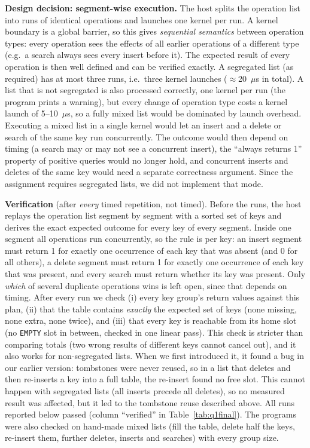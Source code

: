 \documentclass[10pt,a4paper]{article}
\begin{document}
\textbf{Design decision: segment-wise execution.} The host splits the
operation list into runs of identical operations and launches one kernel per
run. A kernel boundary is a global barrier, so this gives \emph{sequential
semantics} between operation types: every operation sees the effects of all
earlier operations of a different type (e.g.\ a search always sees every insert
before it). The expected result of every operation is then well defined and
can be verified exactly. A segregated list (as required) has at most three runs,
i.e.\ three kernel launches ($\approx$20~$\mu$s in total). A list that is not
segregated is also processed correctly, one kernel per run (the program prints a
warning), but every change of operation type costs a kernel launch of
5--10~$\mu$s, so a fully mixed list would be dominated by launch overhead.
Executing a mixed list in a single kernel would let an insert and a delete or
search of the same key run concurrently. The outcome would then depend on timing
(a search may or may not see a concurrent insert), the ``always returns 1''
property of positive queries would no longer hold, and concurrent inserts and
deletes of the same key would need a separate correctness argument. Since the
assignment requires segregated lists, we did not implement that mode.

\textbf{Verification} (after \emph{every} timed repetition, not timed). Before
the runs, the host replays the operation list segment by segment with a sorted
set of keys and derives the exact expected outcome for every key of every
segment. Inside one segment all operations run concurrently, so the rule is
per key: an insert segment must return 1 for exactly one occurrence of each
key that was absent (and 0 for all others), a delete segment must return 1 for
exactly one occurrence of each key that was present, and every search must
return whether its key was present. Only \emph{which} of several duplicate
operations wins is left open, since that depends on timing. After every run we
check
(i) every key group's return values against this plan,
(ii) that the table contains \emph{exactly} the expected set of keys (none
missing, none extra, none twice), and
(iii) that every key is reachable from its home slot (no \texttt{EMPTY} slot in
between, checked in one linear pass).
This check is stricter than comparing totals (two wrong results of different keys
cannot cancel out), and it also works for non-segregated lists. When we first
introduced it, it found a bug in our earlier version: tombstones were never
reused, so in a list that deletes and then re-inserts a key into a full table, the
re-insert found no free slot. This cannot happen with segregated lists (all
inserts precede all deletes), so no measured result was affected, but it led to
the tombstone reuse described above. All runs reported below passed
(column ``verified'' in Table~\ref{tab:q1final}). The programs were also checked
on hand-made mixed lists (fill the table, delete half the keys, re-insert them,
further deletes, inserts and searches) with every group size.
\end{document}
